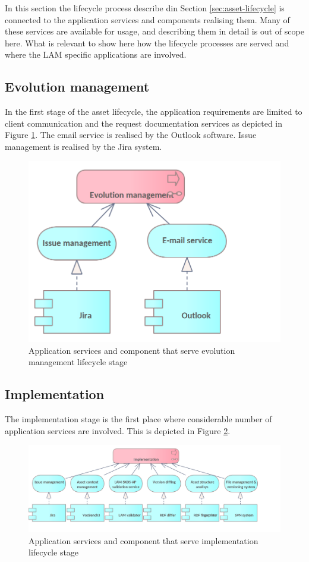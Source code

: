 	In this section the lifecycle process describe din Section \ref{sec:asset-lifecycle} is connected to the application services and components realising them. Many of these services are available for usage, and describing them in detail is out of scope here. What is relevant to show here how the lifecycle processes are served and where the LAM specific applications are involved.
	
	\subsection{Evolution management}
	
	In the first stage of the asset lifecycle, the application requirements are limited to client
communication and the request documentation services as depicted in Figure \ref{fig:app-evolution-management}. The email service is realised by the Outlook software. Issue management is realised by the Jira system.
	
    \begin{figure}[!h]
		\centering
		\includegraphics[width=.45\textwidth]{images/application/lifecycle/Evolution.png}
		\caption{Application services and component that serve evolution management lifecycle stage}
		\label{fig:app-evolution-management}
	\end{figure}

	
	\subsection{Implementation}
	\label{sec:implementation}
	
	The implementation stage is the first place where considerable number of application services are involved. This is depicted in Figure \ref{fig:app-implementation}. 
	
    \begin{figure}[!h]
		\centering
		\includegraphics[width=.95\textwidth]{images/application/lifecycle/Implementation.png}
		\caption{Application services and component that serve implementation lifecycle stage}
		\label{fig:app-implementation}
	\end{figure}
	
